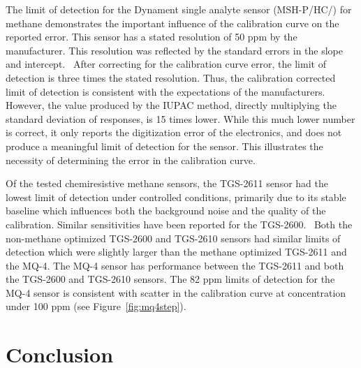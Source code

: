 \documentclass[times]{joehreview}
\begin{document}
	The limit of detection for the Dynament single analyte sensor (MSH-P/HC/) for methane demonstrates the important influence of the calibration curve on the reported error.  This sensor has a stated resolution of 50 ppm by the manufacturer.  This resolution was reflected by the standard errors in the slope and intercept.~\cite{long_limit_1983}   After correcting for the calibration curve error, the limit of detection is three times the stated resolution.  Thus, the calibration corrected limit of detection is consistent with the expectations of the manufacturers.  However, the value produced by the IUPAC method, directly multiplying the standard deviation of responses, is 15 times lower.  While this much lower number is correct, it only reports the digitization error of the electronics, and does not produce a meaningful limit of detection for the sensor.  This illustrates the necessity of determining the error in the calibration curve.
	
	Of the tested chemiresistive methane sensors, the TGS-2611 sensor had the lowest limit of detection under controlled conditions, primarily due to its stable baseline which influences both the background noise and the quality of the calibration.  Similar sensitivities have been reported for the TGS-2600.~\cite{eugster_performance_2012}  Both the non-methane optimized TGS-2600 and TGS-2610 sensors had similar limits of detection which were slightly larger than the methane optimized TGS-2611 and the MQ-4.  The MQ-4 sensor has performance between the TGS-2611 and both the TGS-2600 and TGS-2610 sensors.  The 82 ppm limits of detection for the MQ-4 sensor is consistent with scatter in the calibration curve at concentration under 100 ppm (see Figure~\ref{fig:mq4step}).
	
	\FloatBarrier	
	
	\section*{Conclusion}
	
\end{document}
